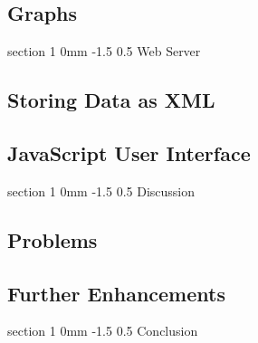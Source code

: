\documentclass[danish,a4paper,11pt]{article}
\makeatletter
\numberwithin{equation}{section}
\renewcommand{\section}{\@startsection
	{section}%
	{1}%
	{0mm}%
	{-1.5\baselineskip}%
	{0.5\baselineskip}%
	{\normalfont\Large\bfseries}} %
\makeatother
\begin{document}
\subsection{Graphs}

\section{Web Server}
\subsection{Storing Data as XML}
\subsection{JavaScript User Interface}

\section{Discussion}
\subsection{Problems}
\subsection{Further Enhancements}

\section{Conclusion}
\end{document}
